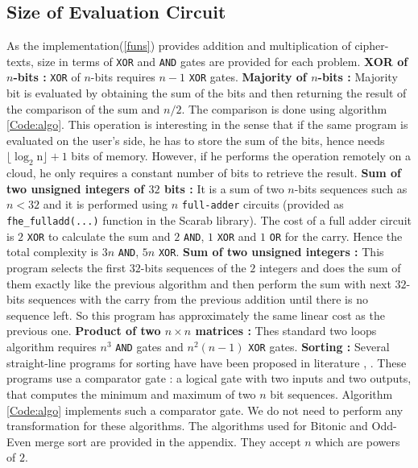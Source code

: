 \documentclass{acm_proc_article-sp}
\begin{document}
\subsection{Size of Evaluation Circuit}
As the implementation(\autoref{funs}) provides addition and multiplication of cipher-texts,  size in terms of \texttt{XOR} and \texttt{AND} gates are provided for each problem. \newline \newline
\textbf{XOR of $n$-bits :} \texttt{XOR} of $n$-bits requires $n-1$ \texttt{XOR} gates. \newline \newline
\textbf{Majority of $n$-bits :} Majority bit is evaluated by obtaining the sum of the bits and then returning the result of the comparison of the sum and $n/2$. The comparison is done using algorithm \autoref{Code:algo}. This operation is interesting in the sense that if the same program is evaluated on the user's side, he has to store the sum of the bits, hence  needs $\mathrm{\lfloor\log_{2}n \rfloor +1}$ bits of memory. However, if he performs the operation remotely on a cloud, he only requires a constant number of bits to retrieve the result. \newline \newline
\textbf{Sum of two unsigned integers of $32$ bits :} It is a sum of two $n$-bits sequences such as $n<32$ and it is performed using $n$ \texttt{full-adder} circuits (provided as \texttt{fhe\_fulladd(...)} function in the Scarab library). The cost of a full adder circuit is $2$ \texttt{XOR} to calculate the sum and $2$ \texttt{AND}, $1$ \texttt{XOR} and $1$ \texttt{OR} for the carry. Hence the total complexity is $3n$ \texttt{AND}, $5n$ \texttt{XOR}. \newline \newline
\textbf{Sum of two unsigned integers :} This program selects the first $32$-bits sequences of the $2$ integers and does the sum of them exactly like the previous algorithm and then perform the sum with next $32$-bits sequences with the carry from the previous addition until there is no sequence left. So this program has approximately the same linear cost as the previous one. \newline \newline
\textbf{Product of two $n\times n$ matrices :} Thes standard two loops algorithm requires $n^3$ \texttt{AND} gates and \texttt{$n^2(n-1)$} \texttt{XOR} gates. \newline \newline
\textbf{Sorting :} Several straight-line programs for sorting have have been proposed in literature \cite{dk}, \cite{Batcher:1968:SNA:1468075.1468121}. These programs use a comparator gate : a logical gate with two inputs and two outputs, that computes the minimum and maximum of two $n$ bit sequences. Algorithm \autoref{Code:algo} implements such a comparator gate. We do not need to perform any transformation for these algorithms. The algorithms used for Bitonic and Odd-Even merge sort are provided in the appendix. They accept $n$ which are powers of $2$.
\end{document}
